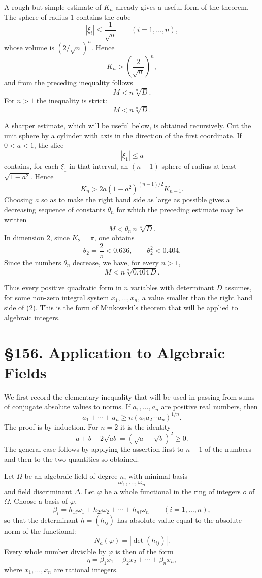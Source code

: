 \documentclass[12pt,a4paper]{article}
\newcommand{\webersection}[2]{\clearpage\section*{\S #1. #2}}
\begin{document}
A rough but simple estimate of \(K_n\) already gives a useful form of the theorem.  The sphere of radius \(1\) contains the cube
\[
  |\xi_i|\le \frac1{\sqrt n}\qquad (i=1,\ldots,n),
\]
whose volume is \((2/\sqrt n)^n\).  Hence
\[
  K_n>\left(\frac2{\sqrt n}\right)^n,
\]
and from the preceding inequality follows
\[
  M<n\sqrt[n]{D}.
\]
For \(n>1\) the inequality is strict:
\[
  M<n\sqrt[n]{D}.
\tag{1}
\]

A sharper estimate, which will be useful below, is obtained recursively.  Cut the unit sphere by a cylinder with axis in the direction of the first coordinate.  If \(0<a<1\), the slice
\[
  |\xi_1|\le a
\]
contains, for each \(\xi_1\) in that interval, an \((n-1)\)-sphere of radius at least \(\sqrt{1-a^2}\).  Hence
\[
  K_n>2a(1-a^2)^{(n-1)/2}K_{n-1}.
\]
Choosing \(a\) so as to make the right hand side as large as possible gives a decreasing sequence of constants \(\theta_n\) for which the preceding estimate may be written
\[
  M<\theta_n\, n\,\sqrt[n]{D}.
\]
In dimension \(2\), since \(K_2=\pi\), one obtains
\[
  \theta_2=\frac{2}{\pi}<0.636,\qquad \theta_2^2<0.404.
\]
Since the numbers \(\theta_n\) decrease, we have, for every \(n>1\),
\[
  M<n\sqrt[n]{0.404\,D}.
\tag{2}
\]

Thus every positive quadratic form in \(n\) variables with determinant \(D\) assumes, for some non-zero integral system \(x_1,\ldots,x_n\), a value smaller than the right hand side of (2).  This is the form of Minkowski's theorem that will be applied to algebraic integers.

\webersection{156}{Application to Algebraic Fields}

We first record the elementary inequality that will be used in passing from sums of conjugate absolute values to norms.  If \(a_1,\ldots,a_n\) are positive real numbers, then
\[
  a_1+\cdots+a_n\ge n(a_1a_2\cdots a_n)^{1/n}.
\tag{1}
\]
The proof is by induction.  For \(n=2\) it is the identity
\[
  a+b-2\sqrt{ab}=(\sqrt a-\sqrt b)^2\ge 0.
\]
The general case follows by applying the assertion first to \(n-1\) of the numbers and then to the two quantities so obtained.

Let \(\Omega\) be an algebraic field of degree \(n\), with minimal basis
\[
  \omega_1,\ldots,\omega_n
\]
and field discriminant \(\Delta\).  Let \(\varphi\) be a whole functional in the ring of integers \(o\) of \(\Omega\).  Choose a basis of \(\varphi\),
\[
  \beta_i=h_{1i}\omega_1+h_{2i}\omega_2+\cdots+h_{ni}\omega_n
  \qquad (i=1,\ldots,n),
\]
so that the determinant \(h=(h_{ij})\) has absolute value equal to the absolute norm of the functional:
\[
  N_a(\varphi)=|\det(h_{ij})|.
\]
Every whole number divisible by \(\varphi\) is then of the form
\[
  \eta=\beta_1x_1+\beta_2x_2+\cdots+\beta_nx_n,
\]
where \(x_1,\ldots,x_n\) are rational integers.
\end{document}
